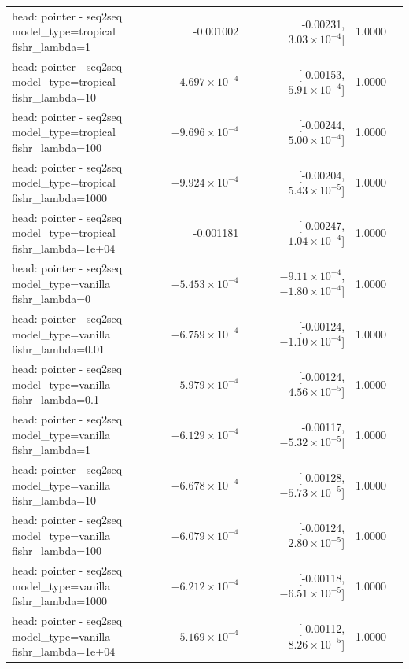 \documentclass[10pt]{article}
\makeatletter
\newcommand{\stackcell}[1]{\begin{tabular}[t]{@{}l@{}}#1\end{tabular}}
\makeatother
\begin{document}
{\begin{longtable}{lrrrl}
\stackcell{head: pointer - seq2seq\\\footnotesize model\_type=tropical fishr\_lambda=1 } & -0.001002 & [-0.00231, $3.03\times10^{-4}$] & 1.0000 & \\
\stackcell{head: pointer - seq2seq\\\footnotesize model\_type=tropical fishr\_lambda=10 } & $-4.697\times10^{-4}$ & [-0.00153, $5.91\times10^{-4}$] & 1.0000 & \\
\stackcell{head: pointer - seq2seq\\\footnotesize model\_type=tropical fishr\_lambda=100 } & $-9.696\times10^{-4}$ & [-0.00244, $5.00\times10^{-4}$] & 1.0000 & \\
\stackcell{head: pointer - seq2seq\\\footnotesize model\_type=tropical fishr\_lambda=1000 } & $-9.924\times10^{-4}$ & [-0.00204, $5.43\times10^{-5}$] & 1.0000 & \\
\stackcell{head: pointer - seq2seq\\\footnotesize model\_type=tropical fishr\_lambda=1e+04 } & -0.001181 & [-0.00247, $1.04\times10^{-4}$] & 1.0000 & \\
\stackcell{head: pointer - seq2seq\\\footnotesize model\_type=vanilla fishr\_lambda=0 } & $-5.453\times10^{-4}$ & [$-9.11\times10^{-4}$, $-1.80\times10^{-4}$] & 1.0000 & \\
\stackcell{head: pointer - seq2seq\\\footnotesize model\_type=vanilla fishr\_lambda=0.01 } & $-6.759\times10^{-4}$ & [-0.00124, $-1.10\times10^{-4}$] & 1.0000 & \\
\stackcell{head: pointer - seq2seq\\\footnotesize model\_type=vanilla fishr\_lambda=0.1 } & $-5.979\times10^{-4}$ & [-0.00124, $4.56\times10^{-5}$] & 1.0000 & \\
\stackcell{head: pointer - seq2seq\\\footnotesize model\_type=vanilla fishr\_lambda=1 } & $-6.129\times10^{-4}$ & [-0.00117, $-5.32\times10^{-5}$] & 1.0000 & \\
\stackcell{head: pointer - seq2seq\\\footnotesize model\_type=vanilla fishr\_lambda=10 } & $-6.678\times10^{-4}$ & [-0.00128, $-5.73\times10^{-5}$] & 1.0000 & \\
\stackcell{head: pointer - seq2seq\\\footnotesize model\_type=vanilla fishr\_lambda=100 } & $-6.079\times10^{-4}$ & [-0.00124, $2.80\times10^{-5}$] & 1.0000 & \\
\stackcell{head: pointer - seq2seq\\\footnotesize model\_type=vanilla fishr\_lambda=1000 } & $-6.212\times10^{-4}$ & [-0.00118, $-6.51\times10^{-5}$] & 1.0000 & \\
\stackcell{head: pointer - seq2seq\\\footnotesize model\_type=vanilla fishr\_lambda=1e+04 } & $-5.169\times10^{-4}$ & [-0.00112, $8.26\times10^{-5}$] & 1.0000 & \\
\bottomrule
\end{longtable}
}
\end{document}
